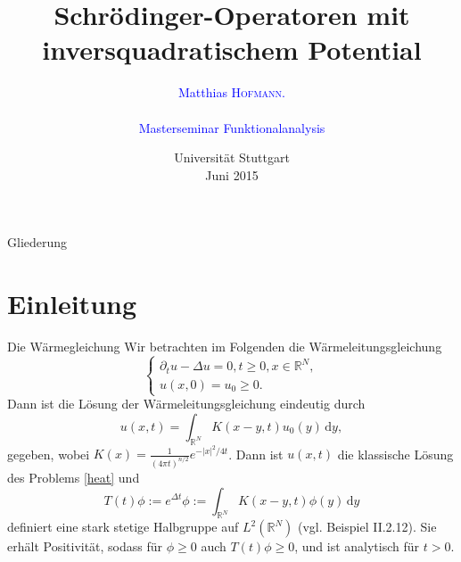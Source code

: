 \documentclass{beamer}
\theoremstyle{break}
\begin{document}
\title[Schrödinger-Operatoren]{Schrödinger-Operatoren mit inversquadratischem Potential} 
\author[\textsc{Hofmann}]{\textcolor{blue}{Matthias \textsc{Hofmann}.\\ \ \\
Masterseminar Funktionalanalysis
}}
 \date{Universität Stuttgart\\ Juni 2015} 
 \begin{frame}
\titlepage	
\end{frame}

\begin{frame}{Gliederung}
  \tableofcontents
\end{frame}

\section{Einleitung}
\begin{frame}{Die Wärmegleichung}
Wir betrachten im Folgenden die W\"armeleitungsgleichung
\begin{equation}\label{heat}
\begin{cases}
\partial_t u - \Delta u =0, t\ge 0, x\in \mathbb R^N,\\
u(x,0)=u_0 \ge 0.
\end{cases}
\end{equation} \pause
Dann ist die L\"osung der W\"armeleitungsgleichung eindeutig durch
\begin{equation}
u(x,t)=\int_{\mathbb R^N} K(x-y, t) u_0(y) \, \mathrm dy,
\end{equation}
gegeben, wobei $K(x)=\frac{1}{(4\pi t)^{n/2}} e^{-|x|^2/4t}$. \pause Dann ist $u(x,t)$ die klassische L\"osung des Problems \eqref{heat} 
und
\begin{equation}
T(t)\phi:=e^{\Delta t}\phi:=\int_{\mathbb R^N} K(x-y,t) \phi(y)\, \mathrm dy 
\end{equation}
definiert eine stark stetige Halbgruppe auf $L^2(\mathbb R^N)$ (vgl. \cite{engel-nagel} Beispiel II.2.12). Sie erh\"alt Positivit\"at, sodass f\"ur $\phi \ge 0$ auch $T(t) \phi \ge 0$, und ist analytisch f\"ur $t>0$.
\end{frame}
\end{document}

